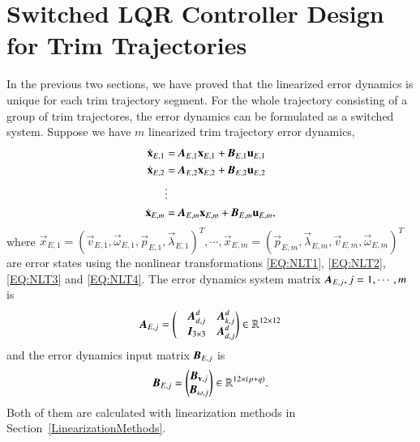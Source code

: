 \section{Switched LQR Controller Design for Trim Trajectories}
In the previous two sections, we have proved that the linearized error dynamics is unique for each trim trajectory segment. For the whole trajectory consisting of a group of trim trajectores, the error dynamics can be formulated as a switched system.   
Suppose we have $m$ linearized trim trajectory error dynamics,
\begin{align}
\dot{\vec{x}}_{E,1} &=\emph{\textbf{A}}_{E,1}\vec{x}_{E,1}+\emph{\textbf{B}}_{E,1}
\vec{u}_{E,1} \nonumber \\
\dot{\vec{x}}_{E,2} &=\emph{\textbf{A}}_{E,2}\vec{x}_{E,2} +\emph{\textbf{B}}_{E,2}
\vec{u}_{E,2}\nonumber \\
& \vdots \nonumber \\
\dot{\vec{x}}_{E,m} &=\emph{\textbf{A}}_{E,m}\vec{x}_{E,m}+\emph{\textbf{B}}_{E,m}
\vec{u}_{E,m},
\end{align}
where $\vec{x}_{E,1}=(\vec{v}_{E,1}, \vec{\omega}_{E,1}, \vec{p}_{E,1}, \vec{\lambda}_{E,1})^{T}, \cdots, \vec{x}_{E,m}=(\vec{p}_{E,m}, \vec{\lambda}_{E,m}, \vec{v}_{E,m}, \vec{\omega}_{E,m})^{T}$ are error states using the nonlinear transformations \ref{EQ:NLT1}, \ref{EQ:NLT2}, \ref{EQ:NLT3} and \ref{EQ:NLT4}. The error dynamics system matrix $\emph{\textbf{A}}_{E,j}, j=1, \cdots, m$ is 
\begin{align}
\emph{\textbf{A}}_{E,j}=
\begin{pmatrix}
&\emph{\textbf{A}}_{d,j}^{d}&\emph{\textbf{A}}_{k,j}^{d} \\
&\emph{\textbf{I}}_{3\times3}&\emph{\textbf{A}}_{d,j}^{d}
\end{pmatrix} \in \mathbb{R}^{12\times 12}
\end{align}
and the error dynamics input matrix $\emph{\textbf{B}}_{E,j}$ is
\begin{align}
\emph{\textbf{B}}_{E,j}=
\begin{pmatrix}
\emph{\textbf{B}}_{\vec{v},j} \\
\emph{\textbf{B}}_{\vec{\omega},j}
\end{pmatrix} \in \mathbb{R}^{12\times (p+q)}.
\end{align}
Both of them are calculated with linearization methods in Section~\ref{LinearizationMethods}. 

